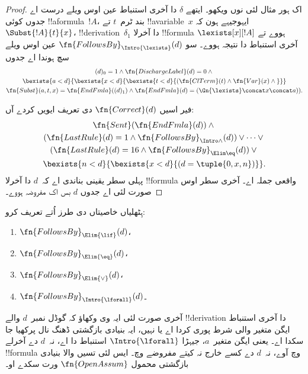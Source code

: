 \documentclass[../../../include/open-logic-section]{subfiles}
\begin{document}
\begin{proof}
  اک ہور مثال لئی \Intro{\lexists}
  نوں ویکھو۔ ایتھے $\delta$
  دا آخری استنباط عین اوس
  ویلے درست اے جدوں کوئی
  !!a{formula}~$!A$، بند ٹرم~$t$
  تے !!a{variable}~$x$ ایہوجیہے
  ہون کہ $\Subst{!A}{t}{x}$،
  !!{derivation}~$\delta_1$ دا
  آخرلا !!{formula} ہووے تے
  $\lexists[x][!A]$ آخری
  استنباط دا نتیجہ ہووے۔
  سو $\fn{FollowsBy}_{\Intro{\lexists}}(d)$
  عین اوس ویلے سچ ہوندا اے جدوں
  \begin{multline*}
    (d)_0 = 1 \land \fn{DischargeLabel}(d) = 0 \land {} \\
    \bexists{a < d}{\bexists{x<d}{\bexists{t<d}{
          (\fn{ClTerm}(t) \land \fn{Var}(x)  \land {}}}}\\
    \fn{Subst}(a,t,x) = \fn{EndFmla}((d)_1) \land
    \fn{EndFmla}(d) = (\Gn{\lexists} \concat x \concat a)).
  \end{multline*}

  فیر اسیں $\fn{Correct}(d)$ دی تعریف ایویں کردے آں:
  \begin{multline*}
    \fn{Sent}(\fn{EndFmla}(d)) \land {}\\
    (\fn{LastRule}(d) = 1 \land
    \fn{FollowsBy}_{\Intro\land}(d)) \lor \dots \lor {}\\
    (\fn{LastRule}(d) = 16 \land \fn{FollowsBy}_{\Elim\eq}(d)) \lor {}\\
    \bexists{n<d}{\bexists{x<d}{(d = \tuple{0, x, n})}}.
  \end{multline*}
  پہلی سطر یقینی بناندی اے کہ~$d$
  دا آخرلا !!{formula} واقعی
  جملہ اے۔ آخری سطر اوس صورت
  لئی اے جدوں $d$ بس اک
  مفروضہ ہووے۔
\end{proof}

\begin{prob}
  ہِٹھلیاں خاصیتاں
  دی طرز اُتے تعریف کرو:
  \begin{enumerate}
  \item $\fn{FollowsBy}_{\Elim{\lif}}(d)$،
  \item $\fn{FollowsBy}_{\Elim{\eq}}(d)$،
  \item $\fn{FollowsBy}_{\Elim{\lor}}(d)$،
  \item $\fn{FollowsBy}_{\Intro{\lforall}}(d)$۔
  \end{enumerate}
  آخری صورت لئی ایہ وی وکھاؤ کہ گوڈل
  نمبر~$d$ والے !!{derivation}
  دا آخری استنباط ایگن متغیر
  والی شرط پوری کردا اے یا
  نہیں، ایہ بنیادی بازگشتی
  ڈھنگ نال پرکھیا جا سکدا اے۔
  یعنی ایگن متغیر~$a$،
  جیہڑا $\Intro{\lforall}$
  استنباط دا اے،
  نہ~$d$ دے آخرلے
  !!{formula} وچ آوے،
  نہ~$d$ دے کسے
  خارج نہ کیتے مفروضے
  وچ۔ ایس لئی تسیں
  والا بنیادی بازگشتی
  محمول $\fn{OpenAssum}$
  ورت سکدے او۔
\end{prob}
\end{document}
